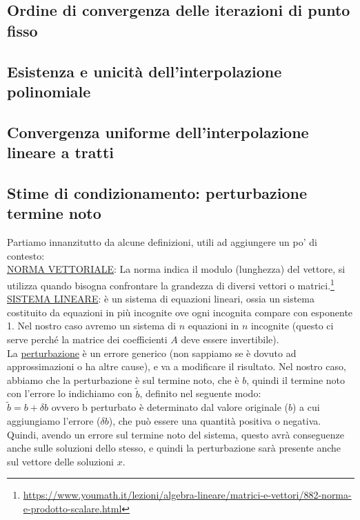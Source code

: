 \subsection{Ordine di convergenza delle iterazioni di punto fisso}

\subsection{Esistenza e unicità dell'interpolazione polinomiale}

\subsection{Convergenza uniforme dell'interpolazione lineare a tratti}

\subsection{Stime di condizionamento: perturbazione termine noto} 
Partiamo innanzitutto da alcune definizioni, utili ad aggiungere un po' di contesto:\\
\underline{NORMA VETTORIALE}: La norma indica il modulo (lunghezza) del vettore, si utilizza quando bisogna confrontare la grandezza di diversi vettori o matrici.\footnote[2]{\url{https://www.youmath.it/lezioni/algebra-lineare/matrici-e-vettori/882-norma-e-prodotto-scalare.html}}\\
\underline{SISTEMA LINEARE}: è un sistema di equazioni lineari, ossia un sistema costituito da equazioni in più incognite ove ogni incognita compare con esponente 1. Nel nostro caso avremo un sistema di $n$ equazioni in $n$ incognite (questo ci serve perché la matrice dei coefficienti $A$ deve essere invertibile).\\
La \underline{perturbazione} è un errore generico (non sappiamo se è dovuto ad approssimazioni o ha altre cause), e va a modificare il risultato. Nel nostro caso, abbiamo che la perturbazione è sul termine noto, che è $b$, quindi il termine noto con l'errore lo indichiamo con $\tilde{b}$, definito nel seguente modo:\\
$\tilde{b}=b+\delta b$ ovvero b perturbato è determinato dal valore originale ($b$) a cui aggiungiamo l'errore ($\delta b$), che può essere una quantità positiva o negativa.\\
Quindi, avendo un errore sul termine noto del sistema, questo avrà conseguenze anche sulle soluzioni dello stesso, e quindi la perturbazione sarà presente anche sul vettore delle soluzioni $x$.\\
